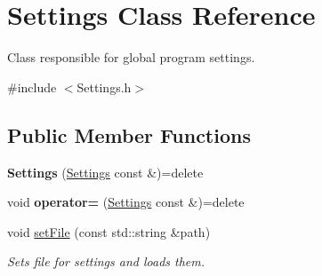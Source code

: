 \hypertarget{classSettings}{\section{Settings Class Reference}
\label{classSettings}
}


Class responsible for global program settings.  




{\ttfamily \#include $<$Settings.\-h$>$}

\subsection*{Public Member Functions}
\begin{DoxyCompactItemize}
\item 
\hypertarget{classSettings_a067d846c74ff69297aeccbf05d2ee94b}{{\bfseries Settings} (\hyperlink{classSettings}{Settings} const \&)=delete}\label{classSettings_a067d846c74ff69297aeccbf05d2ee94b}

\item 
\hypertarget{classSettings_a2b334e67da78df76158fcadd343b7202}{void {\bfseries operator=} (\hyperlink{classSettings}{Settings} const \&)=delete}\label{classSettings_a2b334e67da78df76158fcadd343b7202}

\item 
\hypertarget{classSettings_ae78776f5925ddc2eb747e9df6521c975}{void \hyperlink{classSettings_ae78776f5925ddc2eb747e9df6521c975}{set\-File} (const std\-::string \&path)}\label{classSettings_ae78776f5925ddc2eb747e9df6521c975}

\begin{DoxyCompactList}\small\item\em Sets file for settings and loads them. \end{DoxyCompactList}\end{DoxyCompactItemize}
